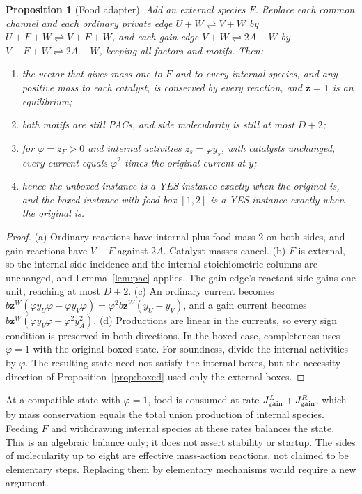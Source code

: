 \documentclass[11pt,a4paper]{article}
\theoremstyle{plain}
\newtheorem{proposition}[theorem]{Proposition}
\theoremstyle{definition}
\theoremstyle{remark}
\newcommand{\rev}{\rightleftharpoons}
\newcommand{\act}{\boldsymbol z}
\newcommand{\one}{\mathbf 1}
\begin{document}
\begin{proposition}[Food adapter]\label{prop:food}
Add an external species $F$. Replace each common channel and each ordinary private edge $U+W\rev V+W$ by $U+F+W\rev V+F+W$, and each gain edge $V+W\rev2A+W$ by $V+F+W\rev2A+W$, keeping all factors and motifs. Then:
\begin{enumerate}[label=\textup{(\alph*)}]
\item the vector that gives mass one to $F$ and to every internal species, and any positive mass to each catalyst, is conserved by every reaction, and $\act=\one$ is an equilibrium;
\item both motifs are still PACs, and side molecularity is still at most $D+2$;
\item for $\varphi=z_F>0$ and internal activities $z_s=\varphi y_s$, with catalysts unchanged, every current equals $\varphi^2$ times the original current at $y$;
\item hence the unboxed instance is a YES instance exactly when the original is, and the boxed instance with food box $[1,2]$ is a YES instance exactly when the original is.
\end{enumerate}
\end{proposition}

\begin{proof}
(a) Ordinary reactions have internal-plus-food mass $2$ on both sides, and gain reactions have $V+F$ against $2A$. Catalyst masses cancel. (b) $F$ is external, so the internal side incidence and the internal stoichiometric columns are unchanged, and Lemma~\ref{lem:pac} applies. The gain edge's reactant side gains one unit, reaching at most $D+2$. (c) An ordinary current becomes $b\act^W(\varphi y_U\varphi-\varphi y_V\varphi)=\varphi^2b\act^W(y_U-y_V)$, and a gain current becomes $b\act^W(\varphi y_V\varphi-\varphi^2y_A^2)$. (d) Productions are linear in the currents, so every sign condition is preserved in both directions. In the boxed case, completeness uses $\varphi=1$ with the original boxed state. For soundness, divide the internal activities by $\varphi$. The resulting state need not satisfy the internal boxes, but the necessity direction of Proposition~\ref{prop:boxed} used only the external boxes.
\end{proof}

At a compatible state with $\varphi=1$, food is consumed at rate $J^L_{\rm gain}+J^R_{\rm gain}$, which by mass conservation equals the total union production of internal species. Feeding $F$ and withdrawing internal species at these rates balances the state. This is an algebraic balance only; it does not assert stability or startup. The sides of molecularity up to eight are effective mass-action reactions, not claimed to be elementary steps. Replacing them by elementary mechanisms would require a new argument.
\end{document}
